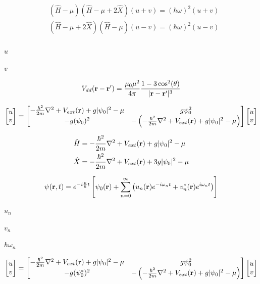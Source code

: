 \documentclass{article}
\begin{document}
\[
  \begin{align}
      & (\hat{H}-\mu)(\hat{H}-\mu+2\hat{X}) (u+v) = (\hbar\omega)^2 (u+v) \nonumber \\
      & (\hat{H}-\mu+2\hat{X})(\hat{H}-\mu) (u-v) = (\hbar\omega)^2 (u-v) \nonumber \\
  \end{align}
 \]
\pagebreak

$u$
\pagebreak

$v$
\pagebreak

\[
    V_{dd}({\bf r}-{\bf r}') = \frac{\mu_0\mu^2}{4\pi}\frac{1-3\cos^2(\theta)}{|{\bf r}-{\bf r}'|^3}
\]
\pagebreak

\[

 \begin{bmatrix}
     u \\
     v
 \end{bmatrix}
     =
 \begin{bmatrix}
     -\frac{\hbar^2}{2m}\nabla^2 + V_{ext}({\bf r}) + g |\psi_0|^2 - \mu & g \psi_0^2 \\
     - g (\psi_0)^2 &  -\left(-\frac{\hbar^2}{2m}\nabla^2 + V_{ext}({\bf r}) + g |\psi_0|^2-\mu\right)
 \end{bmatrix}
 \begin{bmatrix}
     u \\
     v
 \end{bmatrix}

\]
\pagebreak

\[
 \begin{align}
     & \hat{H} = -\frac{\hbar^2}{2m}\nabla^2 + V_{ext}({\bf r}) + g |\psi_0|^2 - \mu\nonumber \\
     & \hat{X} = -\frac{\hbar^2}{2m}\nabla^2 + V_{ext}({\bf r}) + 3 g |\psi_0|^2 - \mu \nonumber \\
 \end{align}
\]
\pagebreak

\[
 \psi({\bf r},t) = e^{-i\frac{\mu}{\hbar}t}\left[ \psi_0({\bf r})
 + \sum_{n=0}^{\infty} \left( u_n({\bf r})e^{-i\omega_n t} + v^*_n({\bf r})e^{i\omega_n t} \right) \right]
\]
\pagebreak

$ u_n $
\pagebreak

$ v_n $
\pagebreak

$ \hbar\omega_n $
\pagebreak

\[

 \begin{bmatrix}
     u \\
     v
 \end{bmatrix}
     =
 \begin{bmatrix}
     -\frac{\hbar^2}{2m}\nabla^2 + V_{ext}({\bf r}) + g |\psi_0|^2 - \mu & g \psi_0^2 \\
     - g (\psi_0^*)^2 &  -\left(-\frac{\hbar^2}{2m}\nabla^2 + V_{ext}({\bf r}) + g |\psi_0|^2-\mu\right)
 \end{bmatrix}
 \begin{bmatrix}
     u \\
     v
 \end{bmatrix}

\]
\pagebreak
\end{document}
